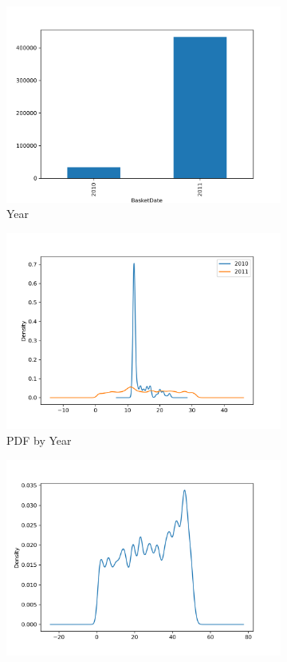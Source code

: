\begin{figure}[!h]
\begin{subfigure}{.5\textwidth}
\centering
\includegraphics[width=.9\textwidth]{img/year_count.png}
\caption{Year}
\label{fig:year_count}
\end{subfigure}
\begin{subfigure}{.5\textwidth}
\centering
\includegraphics[width=.9\textwidth]{img/kde_year.png}
\caption{PDF by Year}
\label{fig:kde_year}
\end{subfigure}
\begin{subfigure}{.5\textwidth}
\centering
\includegraphics[width=.9\textwidth]{img/week_kde.png}

\end{subfigure}
\end{figure}
